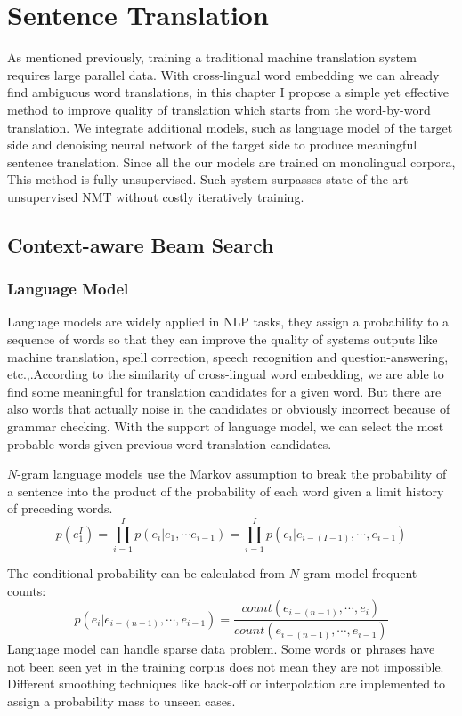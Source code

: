 \chapter{Sentence Translation}
As mentioned previously, training a traditional machine translation system requires large parallel data. With cross-lingual word embedding we can already find ambiguous word translations, in this chapter I propose a simple yet effective method to improve quality of translation which starts from the word-by-word translation. We integrate additional models, such as language model of the target side and denoising neural network of the target side to produce meaningful sentence translation. Since all the our models  are trained on monolingual corpora, This  method is fully unsupervised. Such system surpasses state-of-the-art unsupervised NMT without costly iteratively training.  
\section{Context-aware Beam Search}
	\subsection{Language Model}
		Language models are widely applied in NLP tasks, they assign a probability to a sequence of words so that they can improve the quality of systems outputs like machine translation, spell correction, speech recognition and question-answering, etc.,.According to the similarity of cross-lingual word embedding, we are able to find some meaningful for translation candidates for a given word. But there are also words that actually noise in the candidates or obviously incorrect because of grammar checking. With the support of language model, we can select the most probable words given previous word translation candidates. 
		
		${N}$-gram language models use the Markov assumption to break the probability of a sentence into the product of the probability of each word given a limit history of preceding words. 
		\[ p(e_1^I) = \prod_{i=1}^{I} p(e_i| e_1, \cdots	e_{i-1}) = \prod_{i=1}^I {p(e_i | e_{i-(I-1)}, \cdots , e_{i-1})}  \] 
		
		The conditional probability can be calculated from ${N}$-gram model frequent counts:
		\[p(e_i | e_{i-(n-1)}, \cdots , e_{i-1}) = \frac{count(e_{i-(n-1)}, \cdots, e_i)}{count(e_{i-(n-1)}, \cdots, e_{i-1})} \]
		Language model can handle sparse data problem. Some words or phrases have not been seen yet in the training corpus does not mean they are not impossible. Different smoothing techniques like back-off or interpolation are implemented to assign a probability mass to unseen cases.
